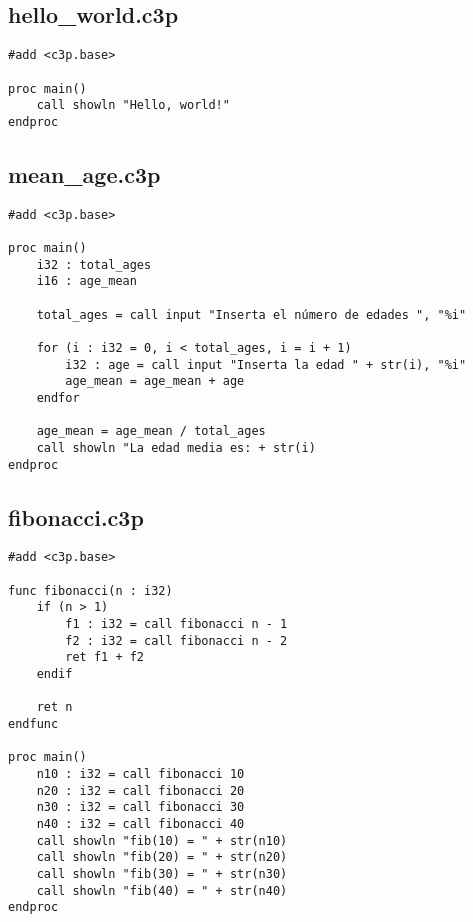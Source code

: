 \subsection{hello\_world.c3p}

\begin{verbatim}
#add <c3p.base>

proc main()
    call showln "Hello, world!"
endproc    
\end{verbatim}

\subsection{mean\_age.c3p}
\begin{verbatim}
#add <c3p.base>

proc main()
    i32 : total_ages
    i16 : age_mean
    
    total_ages = call input "Inserta el número de edades ", "%i"
    
    for (i : i32 = 0, i < total_ages, i = i + 1)
        i32 : age = call input "Inserta la edad " + str(i), "%i"
        age_mean = age_mean + age
    endfor
    
    age_mean = age_mean / total_ages
    call showln "La edad media es: + str(i)
endproc   
\end{verbatim}

\subsection{fibonacci.c3p}

\begin{verbatim}
#add <c3p.base>

func fibonacci(n : i32)
    if (n > 1)
        f1 : i32 = call fibonacci n - 1
        f2 : i32 = call fibonacci n - 2
        ret f1 + f2
    endif
    
    ret n
endfunc

proc main()
    n10 : i32 = call fibonacci 10
    n20 : i32 = call fibonacci 20
    n30 : i32 = call fibonacci 30
    n40 : i32 = call fibonacci 40
    call showln "fib(10) = " + str(n10) 
    call showln "fib(20) = " + str(n20) 
    call showln "fib(30) = " + str(n30) 
    call showln "fib(40) = " + str(n40) 
endproc
\end{verbatim}